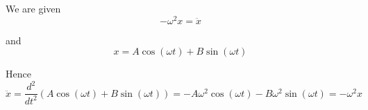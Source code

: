 


\bigskip
We are given
\begin{equation*}
-\omega^2x=\ddot x\tag{10.8}
\end{equation*}

and
\begin{equation*}
x=A\cos(\omega t)+B\sin(\omega t)\tag{10.9}
\end{equation*}

Hence
\begin{equation*}
\ddot x=\frac{d^2}{dt^2}\left(A\cos(\omega t)+B\sin(\omega t)\right)
=-A\omega^2\cos(\omega t)-B\omega^2\sin(\omega t)=-\omega^2 x
\end{equation*}


